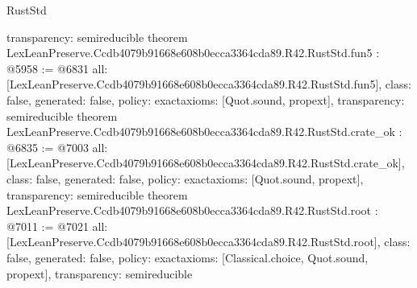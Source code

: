 \begin{lexlean}{RustStd}
\begin{coremodule}
{  transparency: semireducible
}
theorem LexLeanPreserve.Ccdb4079b91668e608b0ecca3364cda89.R42.RustStd.fun5 : @5958 := @6831 {
  all: [LexLeanPreserve.Ccdb4079b91668e608b0ecca3364cda89.R42.RustStd.fun5],
  class: false,
  generated: false,
  policy: exact{axioms: [Quot.sound, propext]},
  transparency: semireducible
}
theorem LexLeanPreserve.Ccdb4079b91668e608b0ecca3364cda89.R42.RustStd.crate_ok : @6835 := @7003 {
  all: [LexLeanPreserve.Ccdb4079b91668e608b0ecca3364cda89.R42.RustStd.crate_ok],
  class: false,
  generated: false,
  policy: exact{axioms: [Quot.sound, propext]},
  transparency: semireducible
}
theorem LexLeanPreserve.Ccdb4079b91668e608b0ecca3364cda89.R42.RustStd.root : @7011 := @7021 {
  all: [LexLeanPreserve.Ccdb4079b91668e608b0ecca3364cda89.R42.RustStd.root],
  class: false,
  generated: false,
  policy: exact{axioms: [Classical.choice, Quot.sound, propext]},
  transparency: semireducible
}


\end{coremodule}
\end{lexlean}
